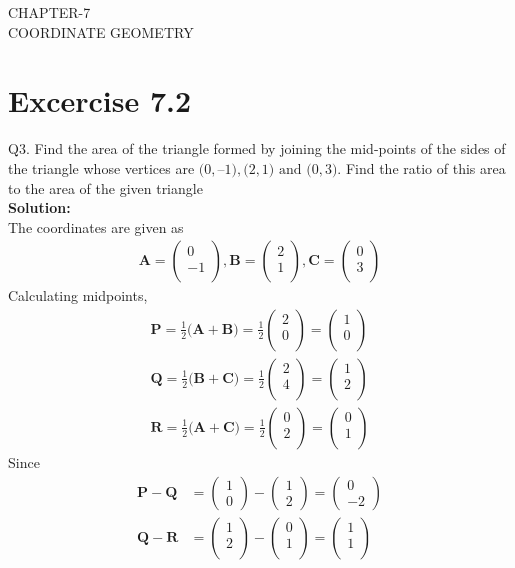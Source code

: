 \documentclass[12pt]{article}
\newcommand{\solution}{\noindent \textbf{Solution: }}
\newcommand{\myvec}[1]{\ensuremath{\begin{pmatrix}#1\end{pmatrix}}}
\let\vec\mathbf
\begin{document}
\begin{center}
\textbf\large{CHAPTER-7 \\ COORDINATE GEOMETRY}
\end{center}
\section*{Excercise 7.2}

Q3. Find the area of the triangle formed by joining the mid-points of the sides of the triangle
whose vertices are $\vec(0, –1), \vec(2, 1) \text{ and } \vec(0, 3)$. Find the ratio of this area to the area of the
given triangle
\\
\solution
\\
\fi
The coordinates are given as
	\begin{align}
	\vec{A} = \myvec{
		0\\
		-1\\
		},
	\vec{B} = \myvec{
		2\\
		1\\
		},
	\vec{C} = \myvec{
		0\\
		3\\
		}
	\end{align}
Calculating midpoints,
	\begin{align}
		\vec{P} = \frac{1}{2}\vec(\vec{A}+\vec{B}) = \frac{1}{2}\myvec{2\\0\\} = \myvec{1\\0\\}\\
		\vec{Q} = \frac{1}{2}\vec(\vec{B}+\vec{C}) = \frac{1}{2}\myvec{2\\4\\} = \myvec{1\\2\\}\\
		\vec{R} = \frac{1}{2}\vec(\vec{A}+\vec{C}) = \frac{1}{2}\myvec{0\\2\\} = \myvec{0\\1\\}
	\end{align}
	Since
	\begin{align}
		\vec{P}-\vec{Q} &=  \myvec{
  1 \\
  0 
 } - \myvec{
  1 \\
  2 
 } = \myvec{
 0 \\
 -2 
 }
		\\
		\vec{Q}-\vec{R} &=  \myvec{
  1 \\
  2 \\
 } - \myvec{
  0 \\
  1 \\
 } = \myvec{
 1 \\
 1 \\
 }
	\end{align}
\end{document}
